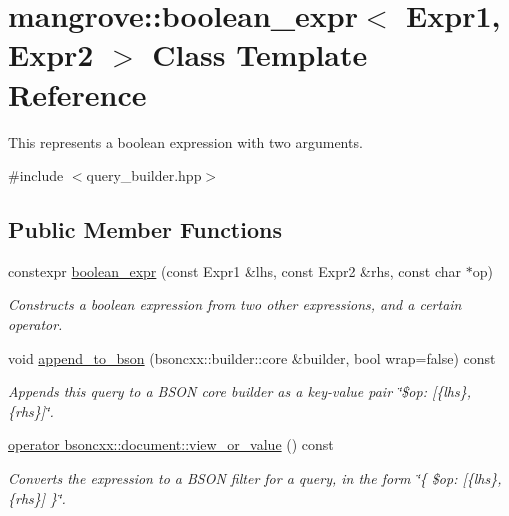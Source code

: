 \hypertarget{classmangrove_1_1boolean__expr}{}\section{mangrove\+:\+:boolean\+\_\+expr$<$ Expr1, Expr2 $>$ Class Template Reference}
\label{classmangrove_1_1boolean__expr}


This represents a boolean expression with two arguments.  




{\ttfamily \#include $<$query\+\_\+builder.\+hpp$>$}

\subsection*{Public Member Functions}
\begin{DoxyCompactItemize}
\item 
constexpr \hyperlink{classmangrove_1_1boolean__expr_a5157d3daeff2e3d8bd7a53a4d98bf1fe}{boolean\+\_\+expr} (const Expr1 \&lhs, const Expr2 \&rhs, const char $\ast$op)
\begin{DoxyCompactList}\small\item\em Constructs a boolean expression from two other expressions, and a certain operator. \end{DoxyCompactList}\item 
void \hyperlink{classmangrove_1_1boolean__expr_ab160beab1d655b6640f30b53ee149338}{append\+\_\+to\+\_\+bson} (bsoncxx\+::builder\+::core \&builder, bool wrap=false) const 
\begin{DoxyCompactList}\small\item\em Appends this query to a B\+S\+ON core builder as a key-\/value pair \char`\"{}\$op\+: \mbox{[}\{lhs\}, \{rhs\}\mbox{]}\char`\"{}. \end{DoxyCompactList}\item 
\hyperlink{classmangrove_1_1boolean__expr_a72b2e366768620bd1960fc54a4c41f8b}{operator bsoncxx\+::document\+::view\+\_\+or\+\_\+value} () const \hypertarget{classmangrove_1_1boolean__expr_a72b2e366768620bd1960fc54a4c41f8b}{}\label{classmangrove_1_1boolean__expr_a72b2e366768620bd1960fc54a4c41f8b}

\begin{DoxyCompactList}\small\item\em Converts the expression to a B\+S\+ON filter for a query, in the form \char`\"{}\{ \$op\+: \mbox{[}\{lhs\}, \{rhs\}\mbox{]} \}\char`\"{}. \end{DoxyCompactList}\end{DoxyCompactItemize}


